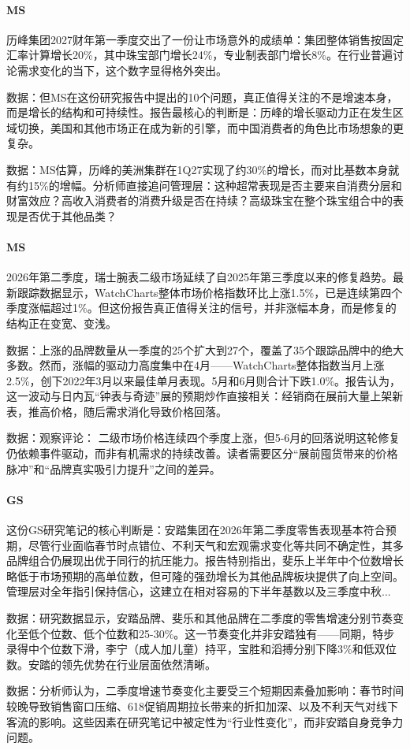 \documentclass[11pt]{ctexart}
\begin{document}
\paragraph{MS} 历峰集团2027财年第一季度交出了一份让市场意外的成绩单：集团整体销售按固定汇率计算增长20\%，其中珠宝部门增长24\%，专业制表部门增长8\%。在行业普遍讨论需求变化的当下，这个数字显得格外突出。
{\small\color{refgray}数据：但MS在这份研究报告中提出的10个问题，真正值得关注的不是增速本身，而是增长的结构和可持续性。报告最核心的判断是：历峰的增长驱动力正在发生区域切换，美国和其他市场正在成为新的引擎，而中国消费者的角色比市场想象的更复杂。\par}
{\small\color{refgray}数据：MS估算，历峰的美洲集群在1Q27实现了约30\%的增长，而对比基数本身就有约15\%的增幅。分析师直接追问管理层：这种超常表现是否主要来自消费分层和财富效应？高收入消费者的消费升级是否在持续？高级珠宝在整个珠宝组合中的表现是否优于其他品类？\par}
\paragraph{MS} 2026年第二季度，瑞士腕表二级市场延续了自2025年第三季度以来的修复趋势。最新跟踪数据显示，WatchCharts整体市场价格指数环比上涨1.5\%，已是连续第四个季度涨幅超过1\%。但这份报告真正值得关注的信号，并非涨幅本身，而是修复的结构正在变宽、变浅。
{\small\color{refgray}数据：上涨的品牌数量从一季度的25个扩大到27个，覆盖了35个跟踪品牌中的绝大多数。然而，涨幅的驱动力高度集中在4月——WatchCharts整体指数当月上涨2.5\%，创下2022年3月以来最佳单月表现。5月和6月则合计下跌1.0\%。报告认为，这一波动与日内瓦“钟表与奇迹”展的预期炒作直接相关：经销商在展前大量上架新表，推高价格，随后需求消化导致价格回落。\par}
{\small\color{refgray}数据：观察评论： 二级市场价格连续四个季度上涨，但5-6月的回落说明这轮修复仍依赖事件驱动，而非有机需求的持续改善。读者需要区分“展前囤货带来的价格脉冲”和“品牌真实吸引力提升”之间的差异。\par}
\paragraph{GS} 这份GS研究笔记的核心判断是：安踏集团在2026年第二季度零售表现基本符合预期，尽管行业面临春节时点错位、不利天气和宏观需求变化等共同不确定性，其多品牌组合仍展现出优于同行的抗压能力。报告特别指出，斐乐上半年中个位数增长略低于市场预期的高单位数，但可隆的强劲增长为其他品牌板块提供了向上空间。管理层对全年指引保持信心，这建立在相对容易的下半年基数以及三季度中秋...
{\small\color{refgray}数据：研究数据显示，安踏品牌、斐乐和其他品牌在二季度的零售增速分别节奏变化至低个位数、低个位数和25-30\%。这一节奏变化并非安踏独有——同期，特步录得中个位数下滑，李宁（成人加儿童）持平，宝胜和滔搏分别下降3\%和低双位数。安踏的领先优势在行业层面依然清晰。\par}
{\small\color{refgray}数据：分析师认为，二季度增速节奏变化主要受三个短期因素叠加影响：春节时间较晚导致销售窗口压缩、618促销周期拉长带来的折扣加深、以及不利天气对线下客流的影响。这些因素在研究笔记中被定性为“行业性变化”，而非安踏自身竞争力问题。\par}
\end{document}
